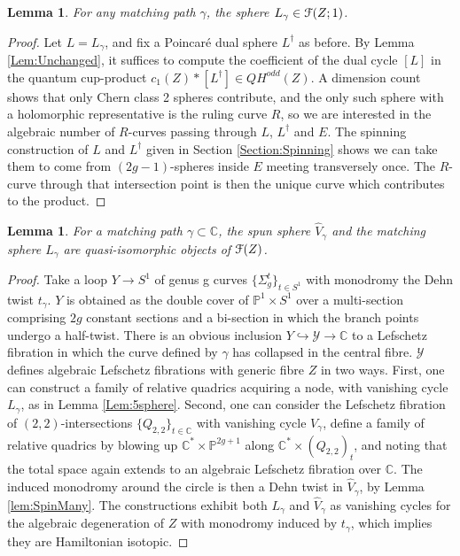 \documentclass[reqno,10pt]{amsart}
\numberwithin{equation}{section}
\newcommand{\bC}{{\mathbb C}}
\newcommand{\bP}{{\mathbb P}}
\newcommand{\scrF}{\EuScript{F}}
\newtheorem{Lemma}[thm]{Lemma}
\theoremstyle{remark}
\begin{document}
\begin{Lemma} \label{Lem:NotNilpotent}
For any matching path $\gamma$, the sphere $L_{\gamma} \in \scrF(Z;1)$.
\end{Lemma}

\begin{proof}
Let $L=L_{\gamma}$, and fix a Poincar\'e dual sphere $L^{\dagger}$ as before.   By Lemma \ref{Lem:Unchanged}, it suffices to compute the coefficient of the dual cycle $[L]$ in the quantum cup-product $c_1(Z) \ast [L^{\dagger}] \in QH^{odd}(Z)$.  A dimension count shows that only Chern class 2 spheres contribute, and the only such sphere with a holomorphic representative is the ruling curve $R$, so we are interested in the algebraic number of $R$-curves passing through $L$, $L^{\dagger}$ and $E$.  The spinning construction of $L$ and $L^{\dagger}$ given in Section \ref{Section:Spinning} shows we can take them to come from $(2g-1)$-spheres inside $E$ meeting transversely once. The $R$-curve through that intersection point is then the unique curve which contributes to the product. 
\end{proof}



\begin{Lemma} \label{Lem:Step1}
For a matching path $\gamma \subset \bC$, the spun sphere $\hat{V}_{\gamma}$ and the matching sphere $L_{\gamma}$ are quasi-isomorphic objects of $\scrF(Z)$.
\end{Lemma}

\begin{proof}
Take a loop $Y \rightarrow S^1$ of genus g curves $\{\Sigma_g^t\}_{t\in S^1}$ with monodromy the Dehn twist $t_{\gamma}$.  $Y$ is obtained as the double cover of $\bP^1 \times S^1$ over a multi-section comprising $2g$ constant sections and a bi-section in which the branch points undergo a half-twist.  There is an obvious inclusion $Y \hookrightarrow \mathcal{Y} \rightarrow \bC$ to a Lefschetz fibration in which the curve defined by $\gamma$ has collapsed in the central fibre.  $\mathcal{Y}$ defines  algebraic Lefschetz fibrations with generic fibre $Z$ in two ways. First, one can construct a family of relative quadrics acquiring a node, with vanishing cycle $L_{\gamma}$, as in Lemma \ref{Lem:5sphere}.  Second, one can consider the Lefschetz fibration of $(2,2)$-intersections $\{Q_{2,2}\}_{t\in \bC}$ with vanishing cycle $V_{\gamma}$,  define a  family of relative quadrics by blowing up $\bC^*\times \bP^{2g+1}$ along $\bC^*\times (Q_{2,2})_t$, and noting that the total space again extends to an algebraic Lefschetz fibration over $\bC$.   The induced monodromy around the circle is then a Dehn twist in $\hat{V}_{\gamma}$, by Lemma \ref{lem:SpinMany}. The constructions exhibit both $L_{\gamma}$ and $\hat{V}_{\gamma}$ as vanishing cycles for the algebraic degeneration of $Z$ with monodromy induced by $t_{\gamma}$, which implies they are Hamiltonian isotopic.
\end{proof}
\end{document}
